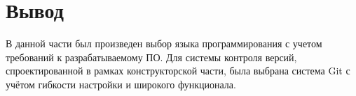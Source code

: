 \section{Вывод} \label{technologic_conclusion}

В данной части был произведен выбор языка программирования с учетом требований к разрабатываемому ПО. Для системы контроля версий, спроектированной в рамках конструкторской части, была выбрана система Git с учётом гибкости настройки и широкого функционала.